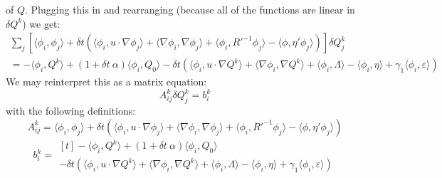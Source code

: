 \documentclass[reqno]{article}
\begin{document}
  of $Q$.
  Plugging this in and rearranging (because all of the functions are linear in
  $\delta Q^k$) we get:
  \begin{multline}
    \sum_j
    \left[  
      \langle \phi_i, \phi_j \rangle
      + \delta t \left(
        \langle \phi_i, u \cdot \nabla \phi_j \rangle 
        + \langle \nabla \phi_i, \nabla \phi_j \rangle
        + \langle \phi_i, R'^{-1} \phi_j \rangle
        - \langle \phi, \eta' \phi_j \rangle  \right)
    \right] \delta Q^k_j
    \\
    =
    - \langle \phi_i, Q^k \rangle
    + (1 + \delta t \: \alpha) \langle \phi_i, Q_0 \rangle
    - \delta t \left(
      \langle \phi_i, u \cdot \nabla Q^k \rangle
      + \langle \nabla \phi_i, \nabla Q^k \rangle
      + \langle \phi_i, \Lambda \rangle
      - \langle \phi_i, \eta \rangle
      + \gamma_1 \langle \phi_i, \varepsilon \rangle
    \right)
  \end{multline}
  We may reinterpret this as a matrix equation:
  \begin{equation}
    A^k_{ij} \delta Q^k_j = b^k_i
  \end{equation}
  with the following definitions:
  \begin{equation}
      A^k_{ij}
      =
      \langle \phi_i, \phi_j \rangle
      + \delta t \left(
        \langle \phi_i, u \cdot \nabla \phi_j \rangle 
        + \langle \nabla \phi_i, \nabla \phi_j \rangle
        + \langle \phi_i, R'^{-1} \phi_j \rangle
        - \langle \phi, \eta' \phi_j \rangle  \right)
  \end{equation}
  \begin{equation}
    b^k_{i}
    =
    \begin{multlined}[t]
    - \langle \phi_i, Q^k \rangle
    + (1 + \delta t \: \alpha) \langle \phi_i, Q_0 \rangle \\
    - \delta t \left(
      \langle \phi_i, u \cdot \nabla Q^k \rangle
      + \langle \nabla \phi_i, \nabla Q^k \rangle
      + \langle \phi_i, \Lambda \rangle
      - \langle \phi_i, \eta \rangle
      + \gamma_1 \langle \phi_i, \varepsilon \rangle
    \right)
    \end{multlined}
  \end{equation}
	
\end{document}
